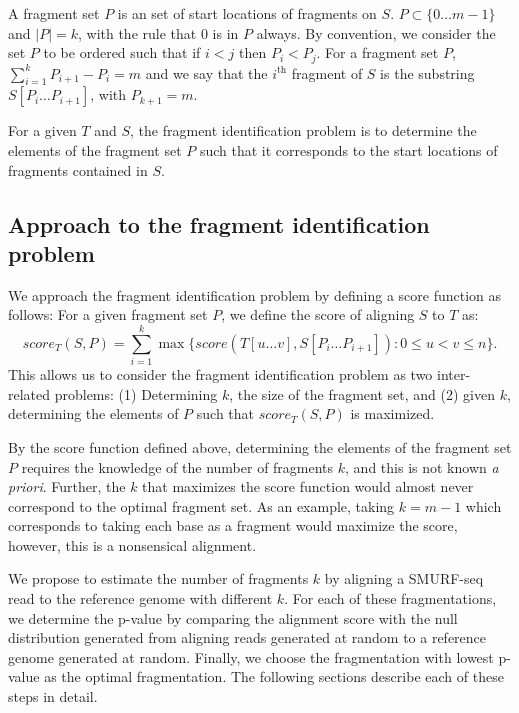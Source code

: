 A fragment set $P$ is an set of start locations of fragments on $S$. $P
\subset \{0 \dots m-1\}$ and $|P| = k$, with the rule that $0$ is in $P$
always.
By convention, we consider the set $P$ to be ordered such that if $i < j$
then $P_i < P_j$.
For a fragment set $P$, $\sum_{i = 1}^{k} P_{i+1} - P_i = m$ and we say
that the $i^{\text{th}}$ fragment of $S$ is the substring $S[P_i \dots
P_{i+1}]$, with $P_{k+1} = m$.

For a given $T$ and $S$, the fragment identification problem is to
determine the elements of the fragment set $P$ such that it corresponds
to the start locations of fragments contained in $S$.



\subsection{Approach to the fragment identification problem}
We approach the fragment identification problem by defining a score
function as follows:
For a given fragment set $P$, we define the score of aligning $S$ to $T$
as: \[score_T(S,P) = \sum_{i=1}^{k} \max\{score(T[u \dots v], S[P_i
\dots P_{i+1}]): 0 \leq u < v \leq n\}.\]
%
This allows us to consider the fragment identification problem as two
inter-related problems: (1) Determining $k$, the size of the fragment
set, and (2) given $k$, determining the elements of $P$ such that
$score_T(S, P)$ is maximized.

By the score function defined above, determining the elements of the
fragment set $P$ requires the knowledge of the number of fragments $k$,
and this is not known \emph{a priori}. Further, the $k$ that maximizes
the score function would almost never correspond to the optimal fragment
set. As an example, taking $k=m-1$ which corresponds to taking each base
as a fragment would maximize the score, however, this is a nonsensical
alignment.

We propose to estimate the number of fragments $k$ by aligning a
SMURF-seq read to the reference genome with different $k$. For each of
these fragmentations, we determine the p-value by comparing the
alignment score with the null distribution generated from aligning reads
generated at random to a reference genome generated at random. Finally,
we choose the fragmentation with lowest p-value as the optimal
fragmentation.  The following sections describe each of these steps in
detail.

